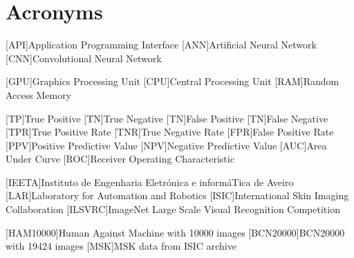 \chapter{Acronyms}

\footnotesize
\SingleSpacing

\begin{multicols}{2}
\begin{acronym}[AAAAAA]

    [API]{Application Programming Interface}
	[ANN]{Artificial Neural Network}
	[CNN]{Convolutional Neural Network}

    [GPU]{Graphics Processing Unit}
	[CPU]{Central Processing Unit}
	[RAM]{Random Access Memory}

    [TP]{True Positive}
    [TN]{True Negative}
    [TN]{False Positive}
    [TN]{False Negative}
    [TPR]{True Positive Rate}
    [TNR]{True Negative Rate}
    [FPR]{False Positive Rate}
    [PPV]{Positive Predictive Value}
    [NPV]{Negative Predictive Value}
    [AUC]{Area Under Curve}
    [ROC]{Receiver Operating Characteristic}

    [IEETA]{Instituto de Engenharia Eletrónica e informáTica de Aveiro}
    [LAR]{Laboratory for Automation and Robotics}
    [ISIC]{International Skin Imaging Collaboration}
    [ILSVRC]{ImageNet Large Scale Visual Recognition Competition}
    
    [HAM10000]{Human Against Machine with 10000 images}
    [BCN20000]{BCN20000 with 19424 images}
    [MSK]{MSK data from ISIC archive}

\end{acronym}
\end{multicols}

